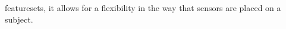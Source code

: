 \documentclass[journal,article,submit,moreauthors,pdftex]{Definitions/mdpi}
\begin{document}
featuresets, it allows for a flexibility in the way that sensors are placed on a subject.

\end{document}
